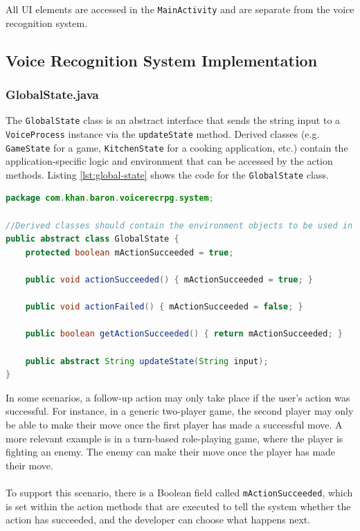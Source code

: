 \documentclass[11pt]{article}
\begin{document}
All UI elements are accessed in the \texttt{MainActivity} and are separate from the voice recognition system.

\subsection{Voice Recognition System Implementation}

\subsubsection{GlobalState.java}

The \texttt{GlobalState} class is an abstract interface that sends the string input to a \texttt{VoiceProcess} instance via the \texttt{updateState} method. Derived classes (e.g. \texttt{GameState} for a game, \texttt{KitchenState} for a cooking application, etc.) contain the application-specific logic and environment that can be accessed by the action methods. Listing \ref{lst:global-state} shows the code for the \texttt{GlobalState} class.

\begin{lstlisting}[language=Java, caption=GlobalState.java, label={lst:global-state}]
package com.khan.baron.voicerecrpg.system;

//Derived classes should contain the environment objects to be used in actions
public abstract class GlobalState {
    protected boolean mActionSucceeded = true;
    
    public void actionSucceeded() { mActionSucceeded = true; }
    
    public void actionFailed() { mActionSucceeded = false; }
    
    public boolean getActionSucceeded() { return mActionSucceeded; }
    
    public abstract String updateState(String input);
}
\end{lstlisting}

In some scenarios, a follow-up action may only take place if the user's action was successful. For instance, in a generic two-player game, the second player may only be able to make their move once the first player has made a successful move. A more relevant example is in a turn-based role-playing game, where the player is fighting an enemy. The enemy can make their move once the player has made their move.
\\
\\
To support this scenario, there is a Boolean field called \texttt{mActionSucceeded}, which is set within the action methods that are executed to tell the system whether the action has succeeded, and the developer can choose what happens next.
\end{document}
